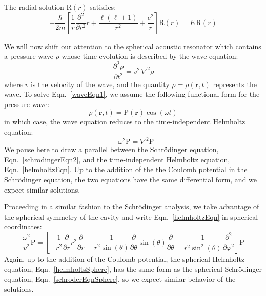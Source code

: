 \documentclass[12pt]{article}
\renewcommand{\vec}[1]{\mathbf{#1}} %
\newcommand{\ppd}[1]{\frac{\partial}{\partial#1}}
\newcommand{\ppsd}[1]{\frac{\partial^2}{\partial #1^2}}
\newcommand{\ppsnd}[2]{\frac{\partial^2 #1}{\partial #2^2}}
\newcommand{\lap}{\nabla^2}
\let\originaleqref=\eqref
\renewcommand{\eqref}{Eqn.\ \originaleqref}
\begin{document}
	The radial solution $\mathrm{R}(r)$ satisfies:
	\begin{equation}
	\label{radialSoln}
		- \frac{\hbar}{2m} \left[ \frac{1}{r} \ppsd{r}r + \frac{\ell(\ell+1)}{r^2} + \frac{e^2}{r} \right] \mathrm{R}(r) = E \, \mathrm{R}(r)
	\end{equation}
	
	\hrulefill
	
	We will now shift our attention to the spherical acoustic resonator which contains a pressure wave $\rho$ whose time-evolution is described by the wave equation:
	\begin{equation}
		\label{waveEqn1}
		\ppsnd{\rho}{t} = v^2 \, \lap\rho
	\end{equation}
	where $v$ is the velocity of the wave, and the quantity $\rho = \rho(\vec{r},t)$ represents the wave. To solve \eqref{waveEqn1}, we assume the following functional form for the pressure wave:
	\begin{equation}
	\label{waveSoln}
		\rho(\vec{r},t) = \mathrm{P}(\vec{r})\cos(\omega t)
	\end{equation}
	in which case, the wave equation reduces to the time-independent Helmholtz equation:
	\begin{equation}
	\label{helmholtzEqn}
		-\omega^2 \mathrm{P} = \lap \mathrm{P}
	\end{equation}
	We pause here to draw a parallel between the Schr\"odinger equation, \eqref{schrodingerEqn2}, and the time-independent Helmholtz equation, \eqref{helmholtzEqn}. Up to the addition of the the Coulomb potential in the Schr\"odinger equation, the two equations have the same differential form, and we expect similar solutions.
	
	Proceeding in a similar fashion to the Schr\"odinger analysis, we take advantage of the spherical symmetry of the cavity and write \eqref{helmholtzEqn} in spherical coordinates:
	\begin{equation}
	\label{helmholtsSphere}
		\frac{\omega^2}{v^2} \mathrm{P} = \left[ -\frac{1}{r^2} \ppd{r}r^2\ppd{r} - \frac{1}{r^2\sin(\theta)}\ppd{\theta}\sin(\theta)\ppd{\theta} -\frac{1}{r^2\sin^2(\theta)} \ppsd{\varphi} \right] \mathrm{P}
	\end{equation}
	Again, up to the addition of the Coulomb potential, the spherical Helmholtz equation, \eqref{helmholtsSphere}, has the same form as the spherical Schr\"odinger equation,  \eqref{schroderEqnSphere}, so we expect similar behavior of the solutions.
\end{document}
